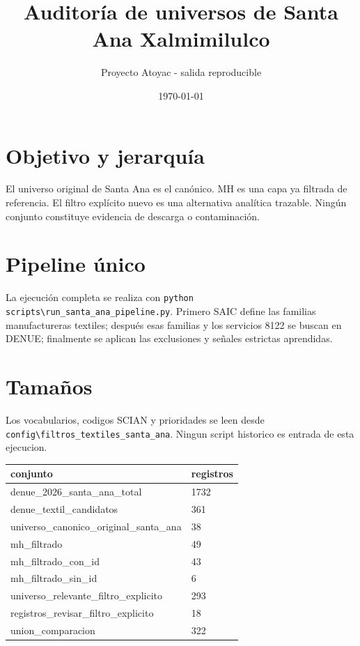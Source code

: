 \documentclass[11pt]{article}
\title{Auditoría de universos de Santa Ana Xalmimilulco}
\author{Proyecto Atoyac - salida reproducible}
\date{\today}
\begin{document}
\maketitle

\section{Objetivo y jerarquía}

El universo original de Santa Ana es el canónico. MH es una capa ya filtrada de referencia. El filtro explícito nuevo es una alternativa analítica trazable. Ningún conjunto constituye evidencia de descarga o contaminación.

\section{Pipeline único}

La ejecución completa se realiza con \texttt{python scripts\textbackslash run\_santa\_ana\_pipeline.py}. Primero SAIC define las familias manufactureras textiles; después esas familias y los servicios 8122 se buscan en DENUE; finalmente se aplican las exclusiones y señales estrictas aprendidas.

\section{Tamaños}

Los vocabularios, codigos SCIAN y prioridades se leen desde \texttt{config\textbackslash filtros\_textiles\_santa\_ana}. Ningun script historico es entrada de esta ejecucion.

\begin{tabular}{ll}
\toprule
conjunto & registros \\
\midrule
denue\_2026\_santa\_ana\_total & 1732 \\
denue\_textil\_candidatos & 361 \\
universo\_canonico\_original\_santa\_ana & 38 \\
mh\_filtrado & 49 \\
mh\_filtrado\_con\_id & 43 \\
mh\_filtrado\_sin\_id & 6 \\
universo\_relevante\_filtro\_explicito & 293 \\
registros\_revisar\_filtro\_explicito & 18 \\
union\_comparacion & 322 \\
\bottomrule
\end{tabular}
\end{document}
